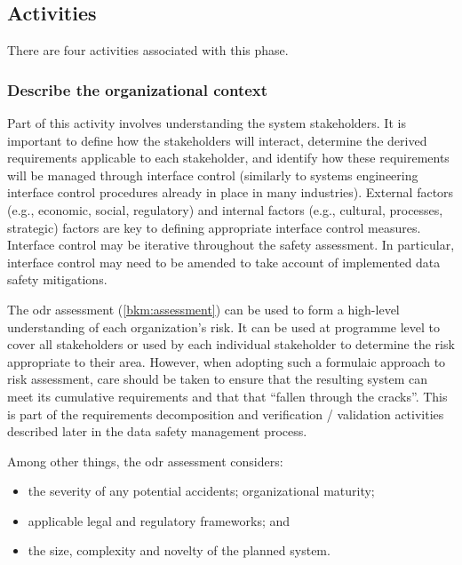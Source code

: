 \subsection{Activities}
There are four activities associated with this phase.

\subsubsection{Describe the organizational context}
Part of this activity involves understanding the system \glspl{stakeholder}. It is important to define how the \glspl{stakeholder} will interact, determine the derived requirements applicable to each \gls{stakeholder}, and identify how these requirements will be managed through interface control (similarly to systems engineering interface control procedures already in place in many industries). External factors (e.g., economic, social, regulatory) and internal factors (e.g., cultural, processes, strategic) factors are key to defining appropriate interface control measures. Interface control may be iterative throughout the \gls{safety assessment}. In particular, interface control may need to be amended to take account of implemented data safety \glspl{mitigation}.

The \gls{odr} assessment (\autoref{bkm:assessment}) can be used to form a high-level understanding of each organization's risk. It can be used at programme level to cover all \glspl{stakeholder} or used by each individual \gls{stakeholder} to determine the
risk appropriate to their area. However, when adopting such a formulaic approach to risk assessment, care should be taken 
to ensure that the resulting system can meet its cumulative requirements and that that ``fallen through the cracks''. This is part of the requirements decomposition and \gls{verification} / \gls{validation} activities described later in the data safety management process.

Among other things, the \gls{odr} assessment considers:
\begin{itemize}
	\item the severity of any potential accidents; organizational maturity; 
	\item applicable legal and regulatory frameworks; and 
	\item the size, complexity and novelty of the planned system.
\end{itemize}

